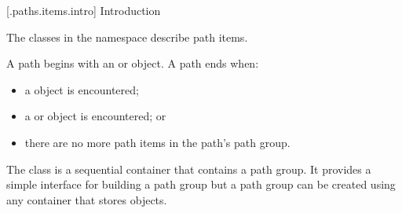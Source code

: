 
 [\iotwod.paths.items.intro] {Introduction}

\pnum
The classes in the  namespace describe path items.

\pnum
A path begins with an  or  object. A path ends when:

\begin{itemize}
\item a  object is encountered;
\item a  or  object is encountered; or
\item there are no more path items in the path's path group.
\end{itemize}

\pnum
The  class is a sequential container that contains a path group. It provides a simple interface for building a path group but a path group can be created using any container that stores  objects.

